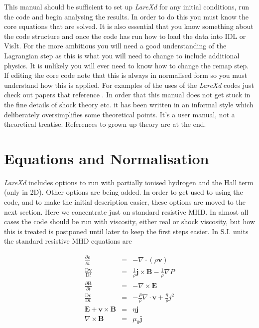 \documentclass[11pt]{article}
\begin{document}
This manual should be sufficient to set up {\it LareXd} for any initial conditions, run the code and begin analysing the results. In order to do this you must know the core equations that are solved. It is also essential that you know something about the code structure and once the code has run how to load the data into IDL or VisIt. For the more ambitious you will need a good understanding of the Lagrangian step as this is what you will need to change to include additional physics. It is unlikely you will ever need to know how to change the remap step. If editing the core code note that this is always in normalised form so you must understand how this is applied. For examples of the uses of the {\it LareXd} codes just check out papers that reference \cite{jcp}. In order that this manual does not get stuck in the fine details of shock theory etc. it has been written in an informal style which deliberately oversimplifies some theoretical points. It's a user manual, not a theoretical treatise. References to grown up theory are at the end. 



\section{Equations and Normalisation}

{\it LareXd} includes options to run with partially ionised hydrogen and the Hall term (only in 2D). Other options are being added. In order to get used to using the code, and to make the initial description easier, these options are moved to the next section. Here we concentrate just on standard resistive MHD. In almost all cases the code should be run with viscosity, either real or shock viscosity, but how this is treated is postponed until later to keep the first steps easier. In S.I. units the standard resistive MHD equations are

\begin{eqnarray}
\frac{\partial \rho}{\partial t}&=&- \nabla\cdot(\rho \mathbf{v})\\
\frac{\mathrm{D}\mathbf{v}}{\mathrm{D}t}&=&\frac{1}{\rho}\mathbf{j}\times\mathbf{B}
-\frac{1}{\rho}\nabla P\\
\frac{\partial \mathbf{B}}{\partial t}&=&-\nabla\times\mathbf{E} \label{faraday}\\
\frac{\mathrm{D}\epsilon}{\mathrm{D}t}&=&-\frac{P}{\rho}\nabla\cdot\mathbf{v}+\frac
{\eta}{\rho}j^{2}\\
\mathbf{E}+\mathbf{v}\times\mathbf{B}&=&\eta \mathbf{j} \label{ohm}\\
\nabla\times\mathbf{B}&=&\mu_0 \mathbf{j}
\end{eqnarray}
\end{document}
